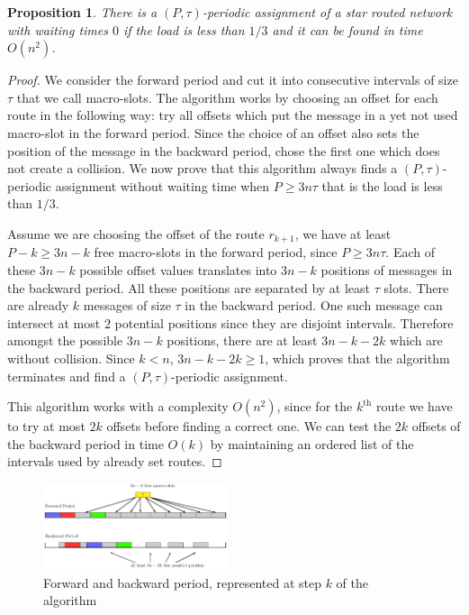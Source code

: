 \documentclass[10pt, conference, letterpaper]{IEEEtran}
\newtheorem{proposition}{Proposition}
\begin{document}
    \begin{proposition}
    There is a $(P,\tau)$-periodic assignment of a star routed network with waiting times $0$ if the load is less than $1/3$ and it can be found in time $O(n^2)$.
    \end{proposition}
    \begin{proof}
     We consider the forward period and cut it into consecutive intervals of size $\tau$ that we call macro-slots. The algorithm works by choosing an offset for each route in the following way: try all offsets which put the message in a yet not used macro-slot in the forward
     period. Since the choice of an offset also sets the position of the message in the backward period, chose the first one which does not create a collision. We now prove that this algorithm always finds a $(P,\tau)$-periodic assignment without waiting time when $P \geq 3n\tau$ that is the load is less than $1/3$.
     
     Assume we are choosing the offset of the route $r_{k+1}$, we have at least $P - k \geq 3n - k$ free macro-slots in the forward period, since $P \geq 3n\tau$. Each of these $3n - k$ possible offset values translates into $3n - k$ positions of messages in the backward period. All these positions are separated by at least $\tau$ slots. There are already $k$ messages of size $\tau$ in the backward period. One such message can intersect at most $2$ potential positions since they are disjoint intervals. Therefore  amongst the possible $3n - k$ positions, there are  at least $3n - k -2k$ which are without collision. Since $k < n$, $3n - k -2k \geq 1$, which proves that the algorithm terminates and find a  $(P,\tau)$-periodic assignment. 
   
     This algorithm works with a complexity $O(n^2)$, since for the $k^{\text{th}}$ route we have to try at most $2k$ offsets before finding a correct one. We can test the $2k$ offsets of the backward period in time $O(k)$ by maintaining an ordered list of the intervals used by already set routes.
     \end{proof}
     \begin{figure}
      \begin{center}
      \includegraphics[width=0.48\textwidth]{ex3nt.pdf}
      \end{center}
      \caption{Forward and backward period, represented at step $k$ of the algorithm}
      \end{figure}
\end{document}
